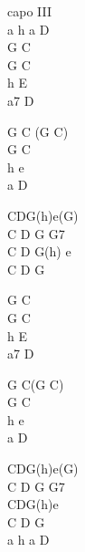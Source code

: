 \begin{chord}
    \small{
capo III\\
a h a D\\
G C\\
G C\\
h E\\
a7 D

G C (G C)\\
G C\\
h e\\
a D

CDG(h)e(G)\\
C D G G7\\
C D G(h) e\\
C D G

G C\\
G C\\
h E\\
a7 D

G C(G C)\\
G C\\
h e\\
a D

CDG(h)e(G)\\
C D G G7\\
CDG(h)e\\
C D G\\
a h a D
    }
\end{chord}





